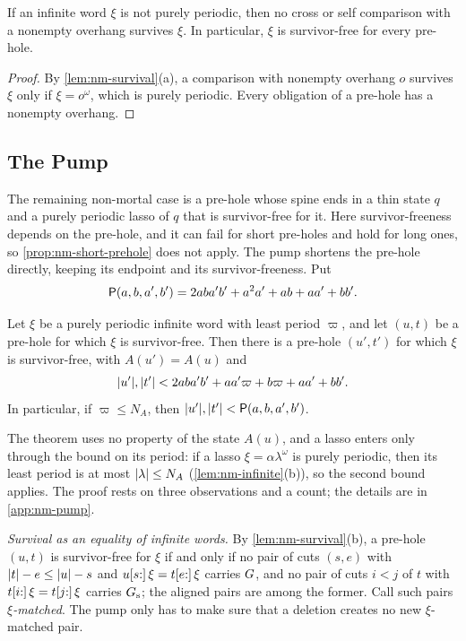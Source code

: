 \begin{lemma}\label{lem:nm-aperiodic}
If an infinite word $\xi$ is not purely periodic, then no cross or self
comparison with a nonempty overhang survives $\xi$. In particular, $\xi$ is
survivor-free for every pre-hole.
\end{lemma}

\begin{proof}
By \cref{lem:nm-survival}(a), a comparison with nonempty overhang $o$ survives
$\xi$ only if $\xi=o^\omega$, which is purely periodic. Every obligation of a
pre-hole has a nonempty overhang.
\end{proof}

\subsection{The Pump}\label{sec:nm-pump}

The remaining non-mortal case is a pre-hole whose spine ends in a thin state
$q$ and a purely periodic lasso of $q$ that is survivor-free for it. Here
survivor-freeness depends on the pre-hole, and it can fail for short pre-holes
and hold for long ones, so \cref{prop:nm-short-prehole} does not apply. The
pump shortens the pre-hole directly, keeping its endpoint and its
survivor-freeness. Put
\[
 \mathsf P(a,b,a',b')=2aba'b'+a^2a'+ab+aa'+bb' .
\]

\begin{theorem}[Pump]\label{thm:nm-pump}
Let $\xi$ be a purely periodic infinite word with least period $\varpi$, and let
$(u,t)$ be a pre-hole for which $\xi$ is survivor-free. Then there is a
pre-hole $(u',t')$ for which $\xi$ is survivor-free, with $A(u')=A(u)$ and
\[
 \lvert u'\rvert,\lvert t'\rvert<2aba'b'+aa'\varpi+b\varpi+aa'+bb' .
\]
In particular, if $\varpi\le N_A$, then $\lvert u'\rvert,\lvert t'\rvert<\mathsf P(a,b,a',b')$.
\end{theorem}

The theorem uses no property of the state $A(u)$, and a lasso enters only
through the bound on its period: if a lasso $\xi=\alpha\lambda^\omega$ is purely
periodic, then its least period is at most $\lvert \lambda\rvert\le N_A$
(\cref{lem:nm-infinite}(b)), so the second bound applies. The proof rests on three
observations and a count; the details are in \cref{app:nm-pump}.

\emph{Survival as an equality of infinite words.} By
\cref{lem:nm-survival}(b), a pre-hole $(u,t)$ is survivor-free for $\xi$ if and
only if no pair of cuts $(s,e)$ with $\lvert t\rvert-e\le\lvert u\rvert-s$ and
$u[s{:}]\,\xi=t[e{:}]\,\xi$ carries $G$, and no pair of cuts $i<j$ of $t$
with $t[i{:}]\,\xi=t[j{:}]\,\xi$ carries $G_{\mathrm{s}}$; the aligned pairs are
among the former. Call such pairs \emph{$\xi$-matched}. The pump only has to
make sure that a deletion creates no new $\xi$-matched pair.

